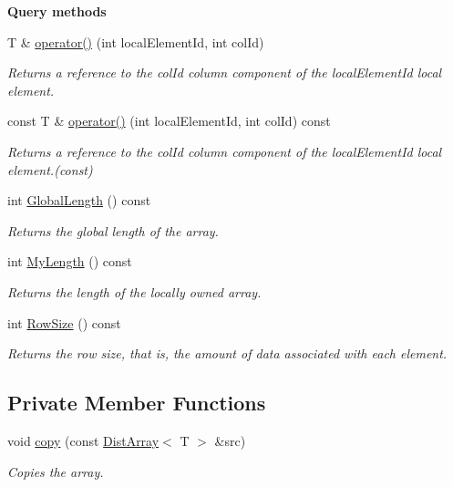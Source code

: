 \begin{Indent}{\bf Query methods}\par
\begin{DoxyCompactItemize}
\item 
T \& \hyperlink{class_q_u_e_s_o_1_1_dist_array_a910410bb8104a49f71a8a14700d4681a}{operator()} (int local\-Element\-Id, int col\-Id)
\begin{DoxyCompactList}\small\item\em Returns a reference to the col\-Id column component of the local\-Element\-Id local element. \end{DoxyCompactList}\item 
const T \& \hyperlink{class_q_u_e_s_o_1_1_dist_array_a44dad0d61e798227cf34528969c2096a}{operator()} (int local\-Element\-Id, int col\-Id) const 
\begin{DoxyCompactList}\small\item\em Returns a reference to the col\-Id column component of the local\-Element\-Id local element.(const) \end{DoxyCompactList}\item 
int \hyperlink{class_q_u_e_s_o_1_1_dist_array_a74e491ed573af8b81f701e2ca136206e}{Global\-Length} () const 
\begin{DoxyCompactList}\small\item\em Returns the global length of the array. \end{DoxyCompactList}\item 
int \hyperlink{class_q_u_e_s_o_1_1_dist_array_af4a798f5defa6a37dfc82175c7f92f83}{My\-Length} () const 
\begin{DoxyCompactList}\small\item\em Returns the length of the locally owned array. \end{DoxyCompactList}\item 
int \hyperlink{class_q_u_e_s_o_1_1_dist_array_ac20dd88a7b36e19948c39b8f1a1ab805}{Row\-Size} () const 
\begin{DoxyCompactList}\small\item\em Returns the row size, that is, the amount of data associated with each element. \end{DoxyCompactList}\end{DoxyCompactItemize}
\end{Indent}
\subsection*{Private Member Functions}
\begin{DoxyCompactItemize}
\item 
void \hyperlink{class_q_u_e_s_o_1_1_dist_array_a415ab5d9ac5074d71497e1ab4c9460f8}{copy} (const \hyperlink{class_q_u_e_s_o_1_1_dist_array}{Dist\-Array}$<$ T $>$ \&src)
\begin{DoxyCompactList}\small\item\em Copies the array. \end{DoxyCompactList}\end{DoxyCompactItemize}
